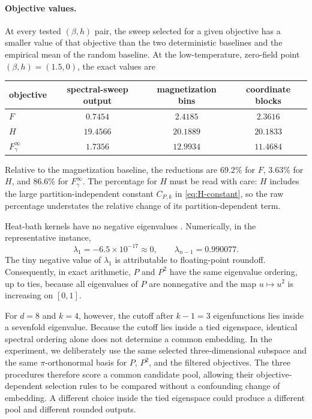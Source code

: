 \documentclass[11pt]{article}
\newcommand{\1}{\mathbf{1}}
\begin{document}
\paragraph{Objective values.}
At every tested $(\beta,h)$ pair, the sweep selected for a given
objective has a smaller value of that objective than the two
deterministic baselines and the empirical mean of the random baseline.
At the low-temperature, zero-field point $(\beta,h)=(1.5,0)$, the exact
values are
\begin{center}
\begin{tabular}{@{}lccc@{}}
    \toprule
    objective
    &spectral-sweep output
    &magnetization bins
    &coordinate blocks\\
    \midrule
    $F$&$0.7454$&$2.4185$&$2.3616$\\
    $H$&$19.4566$&$20.1889$&$20.1833$\\
    $F_\gamma^\infty$&$1.7356$&$12.9934$&$11.4684$\\
    \bottomrule
\end{tabular}
\end{center}
Relative to the magnetization baseline, the reductions are $69.2\%$
for $F$, $3.63\%$ for $H$, and $86.6\%$ for
$F_\gamma^\infty$.  The percentage for $H$ must be read with care:
$H$ includes the large partition-independent constant $C_{P,k}$ in
\eqref{eq:H-constant}, so the raw percentage understates the relative
change of its partition-dependent term.

Heat-bath kernels have no negative eigenvalues
\citep{DyerGreenhillUllrich2014}. Numerically, in the representative
instance,
\[
\lambda_1=-6.5\times10^{-17}\approx0,
\qquad
\lambda_{n-1}=0.990077.
\]
The tiny negative value of $\lambda_1$ is attributable to
floating-point roundoff.  Consequently, in exact arithmetic, $P$ and
$P^2$ have the same eigenvalue ordering, up to ties, because all
eigenvalues of $P$ are nonnegative and the map $u\mapsto u^2$ is
increasing on $[0,1]$.

For $d=8$ and $k=4$, however, the cutoff after $k-1=3$
eigenfunctions lies inside a sevenfold eigenvalue.  Because the cutoff
lies inside a tied eigenspace, identical spectral ordering alone does
not determine a common embedding.  In the experiment, we deliberately
use the same selected three-dimensional subspace and the same
$\pi$-orthonormal basis for $P$, $P^2$, and the filtered objectives.
The three procedures therefore score a common candidate pool,
allowing their objective-dependent selection rules to be compared
without a confounding change of embedding.  A different choice inside
the tied eigenspace could produce a different pool and different
rounded outputs.
\end{document}
